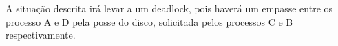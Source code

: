 \begin{question}

    A situação descrita irá levar a um deadlock, pois haverá um empasse 
    entre os processo A e D pela posse do disco, solicitada pelos processos 
    C e B respectivamente.

\end{question}
